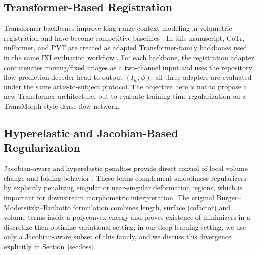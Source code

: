\documentclass[11pt,a4paper]{article}
\begin{document}
\subsection{Transformer-Based Registration}
Transformer backbones improve long-range context modeling in volumetric registration and have become competitive baselines \citep{chen2022transmorph,liu2021swin}. In this manuscript, CoTr, nnFormer, and PVT are treated as adapted Transformer-family backbones used in the same IXI evaluation workflow \citep{xie2021cotr,zhou2023nnformer,wang2021pvt}. For each backbone, the registration adapter concatenates moving/fixed images as a two-channel input and uses the repository flow-prediction decoder head to output \((I_w,\phi)\); all three adapters are evaluated under the same atlas-to-subject protocol. The objective here is not to propose a new Transformer architecture, but to evaluate training-time regularization on a TransMorph-style dense-flow network.

\subsection{Hyperelastic and Jacobian-Based Regularization}
Jacobian-aware and hyperelastic penalties provide direct control of local volume change and folding behavior \citep{burger2013hyperelastic}. These terms complement smoothness regularizers by explicitly penalizing singular or near-singular deformation regions, which is important for downstream morphometric interpretation. The original Burger--Modersitzki--Ruthotto formulation combines length, surface (cofactor) and volume terms inside a polyconvex energy and proves existence of minimizers in a discretize-then-optimize variational setting; in our deep-learning setting, we use only a Jacobian-aware subset of this family, and we discuss this divergence explicitly in Section~\ref{sec:loss}.
\end{document}
